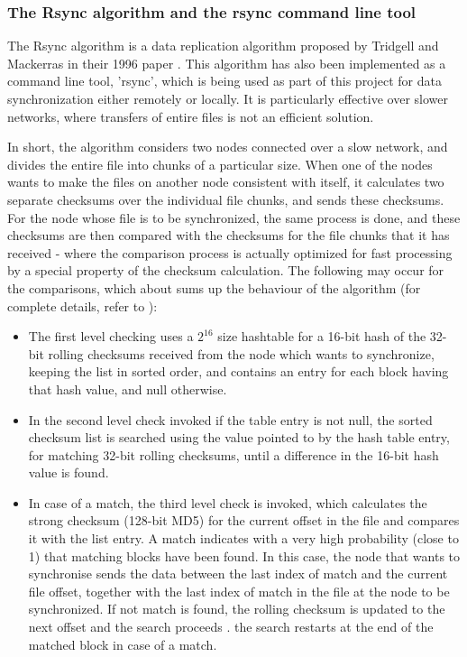 \documentclass[14pt]{article}
\begin{document}
\subsubsection{The Rsync algorithm and the rsync command line tool}
The Rsync algorithm is a data replication algorithm proposed by Tridgell and Mackerras in their 1996 paper \cite{tridgell1996rsync}. This algorithm has also been implemented as a command line tool, 'rsync', which is being used as part of this project for data synchronization either remotely or locally. It is particularly effective over slower networks, where transfers of entire files is not an efficient solution. 

In short, the algorithm considers two nodes connected over a slow network, and divides the entire file into chunks of a particular size. When one of the nodes wants to make the files on another node consistent with itself, it calculates two separate checksums over the individual file chunks, and sends these checksums. For the node whose file is to be synchronized, the same process is done, and these checksums are then compared with the checksums for the file chunks that it has received - where the comparison process is actually optimized for fast processing by a special property of the checksum calculation. The following may occur for the comparisons, which about sums up the behaviour of the algorithm (for complete details, refer to \cite{tridgell1996rsync}):

\begin{itemize}

\item The first level checking uses a $2^{16}$ size hashtable for a 16-bit hash of the 32-bit rolling checksums received from the node which wants to synchronize, keeping the list in sorted order, and contains an entry for each block having that hash value, and null otherwise.

\item In the second level check invoked if the table entry is not null, the sorted checksum list is searched using the value pointed to by the hash table entry, for matching 32-bit rolling checksums, until a difference in the 16-bit hash value is found.

\item In case of a match, the third level check is invoked, which calculates the strong checksum (128-bit MD5) for the current offset in the file and compares it with the list entry. A match indicates with a very high probability (close to 1) that matching blocks have been found. In this case, the node that wants to synchronise sends the data between the last index of match and the current file offset, together with the last index of match in the file at the node to be synchronized. If not match is found, the rolling checksum is updated to the next offset and the search proceeds \cite{tridgell1996rsync}. the search restarts at the end of the matched block in case of a match.

\end{itemize}
\end{document}
